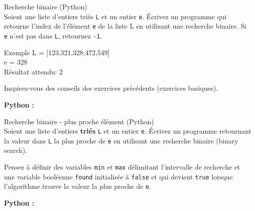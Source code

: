 \begin{Exercice}[10 minutes] Recherche binaire (Python)\\

    Soient une liste d’entiers triés \lstinline{L} et un entier \lstinline{e}. Écrivez un programme qui retourne l'index de l'élément \lstinline{e} de la liste L en utilisant une recherche binaire. Si \lstinline{e} n’est pas dans \lstinline{L}, retournez \lstinline{-1}.\\
    
    \begin{Example}{\faTerminal \quad Exemple}
        L = [123,321,328,472,549] \\
    
        e = 328\\
    
    Résultat attendu: 2
    \end{Example}
    
    
    
    \begin{conseil}
        Inspirez-vous des conseils des exercices précédents (exercices basiques).
    \end{conseil}
    
        \begin{solution}
            \textbf{Python :}
            
        \end{solution}
    
    \end{Exercice}
    

\begin{Exercice}[15 minutes] Recherche binaire - plus proche élément (Python)\\

Soient une liste d’entiers \textbf{triés} \lstinline{L} et un entier \lstinline{e}. Écrivez un programme retournant la valeur dans \lstinline{L} la plus proche de \lstinline{e} en utilisant une recherche binaire (binary search).\\



\begin{conseil}
    Pensez à définir des variables \lstinline{min} et \lstinline{max} délimitant l'intervalle de recherche et une variable booléenne \lstinline{found} initialisée à \lstinline{false} et qui devient \lstinline{true} lorsque l'algorithme trouve la valeur la plus proche de \lstinline{e}. 
    
\end{conseil}

    \begin{solution}
        \textbf{Python :}
        
    \end{solution}

\end{Exercice}



